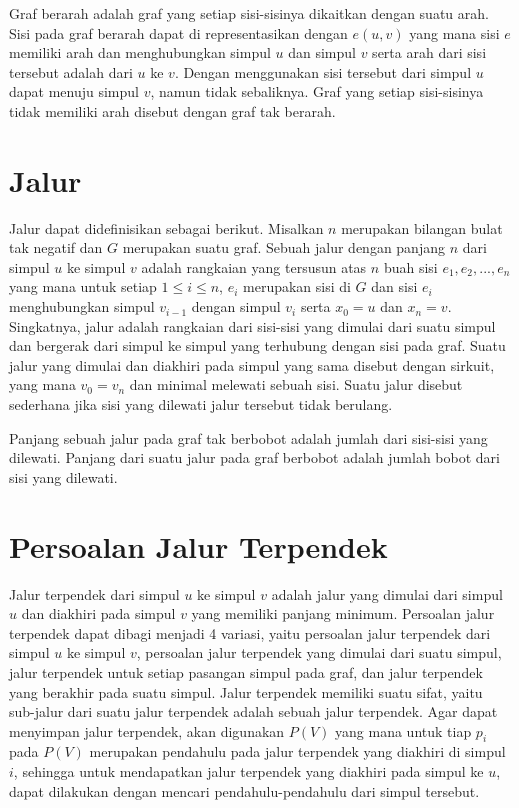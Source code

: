 Graf berarah adalah graf yang setiap sisi-sisinya dikaitkan dengan suatu arah. Sisi pada graf berarah 
dapat di representasikan dengan $e (u, v)$ yang mana sisi $e$ memiliki arah dan menghubungkan 
simpul $u$ dan simpul $v$ serta arah dari sisi tersebut adalah dari $u$ ke $v$. Dengan menggunakan 
sisi tersebut dari simpul $u$ dapat menuju simpul $v$, namun tidak sebaliknya. Graf yang setiap sisi-sisinya 
tidak memiliki arah disebut dengan graf tak berarah.

\section{Jalur}

Jalur dapat didefinisikan sebagai berikut. Misalkan $n$ merupakan bilangan bulat tak negatif dan $G$ merupakan suatu graf. Sebuah jalur dengan 
panjang $n$ dari simpul $u$ ke simpul $v$ adalah rangkaian yang tersusun atas $n$ buah sisi $e_{1}, e_{2}, ..., e_{n}$ yang mana untuk setiap $1 \leq i \leq n$, $e_{i}$ merupakan sisi 
di $G$ dan sisi $e_{i}$ menghubungkan simpul $v_{i-1}$ dengan simpul $v_{i}$ serta $x_{0} = u$ dan $x_{n} = v$. Singkatnya, jalur adalah rangkaian dari sisi-sisi yang dimulai dari 
suatu simpul dan bergerak dari simpul ke simpul yang terhubung dengan sisi pada graf. Suatu jalur yang dimulai dan diakhiri pada simpul yang sama disebut 
dengan sirkuit, yang mana $v_{0} = v_{n}$ dan minimal melewati sebuah sisi. Suatu jalur disebut sederhana jika sisi yang dilewati jalur tersebut tidak berulang.

Panjang sebuah jalur pada graf tak berbobot adalah jumlah dari sisi-sisi yang dilewati. Panjang dari suatu jalur pada graf berbobot adalah jumlah bobot dari sisi yang dilewati.

\section{Persoalan Jalur Terpendek}

Jalur terpendek dari simpul $u$ ke simpul $v$ adalah jalur yang dimulai dari simpul $u$ dan diakhiri pada simpul $v$ yang memiliki panjang minimum. 
Persoalan jalur terpendek dapat dibagi menjadi 4 variasi, yaitu persoalan jalur terpendek dari simpul $u$ ke simpul $v$, persoalan jalur terpendek yang 
dimulai dari suatu simpul, jalur terpendek untuk setiap pasangan simpul pada graf, dan jalur terpendek yang berakhir pada suatu simpul. Jalur 
terpendek memiliki suatu sifat, yaitu sub-jalur dari suatu jalur terpendek adalah sebuah jalur terpendek. Agar dapat menyimpan jalur terpendek, 
akan digunakan $P(V)$ yang mana untuk tiap $p_{i}$ pada $P(V)$ merupakan pendahulu pada jalur terpendek yang diakhiri di simpul $i$, sehingga untuk mendapatkan 
jalur terpendek yang diakhiri pada simpul ke $u$, dapat dilakukan dengan mencari pendahulu-pendahulu dari simpul tersebut.

